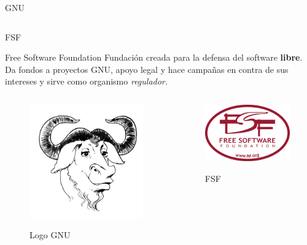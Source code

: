 \documentclass[12pt]{beamer}
\begin{document}
\begin{frame}{GNU}
\begin{columns}
\begin{column}{0.5\textwidth}
		\end{column}
	\end{columns}
\end{frame}

\begin{frame}{FSF}
	\begin{block}{Free Software Foundation}
		Fundación creada para la defensa del software \textbf{libre}. Da fondos a proyectos GNU, apoyo legal y hace campañas en contra de sus intereses y sirve como organismo \textit{regulador.}
	\end{block}
\begin{columns}
	\begin{column}{0.5\textwidth}
	\begin{figure}
		\centering
		\href{https://www.gnu.org/licenses/licenses.html}{\includegraphics[width=0.5\linewidth]{gerwinski-gnu-head}}
		\caption{Logo GNU}
		\label{fig:gerwinski-gnu-head}
	\end{figure}
\end{column}
\begin{column}{0.5\textwidth}
	\begin{figure}
		\centering
		\href{https://www.fsf.org/}{\includegraphics[width=0.7\linewidth]{fsf}}
		\caption{FSF}
		\label{fig:fsf}
	\end{figure}
	
\end{column}
\end{columns}

\end{frame}
\end{document}
